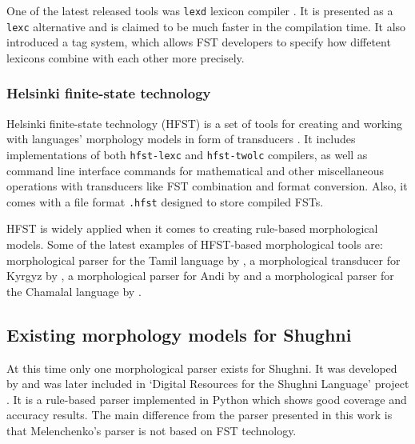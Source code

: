 One of the latest released tools was \texttt{lexd} lexicon compiler \parencite{swanson_lexd_2021}. It is presented as a \texttt{lexc} alternative and is  claimed to be much faster in the compilation time. It also introduced a tag system, which allows FST developers to specify how diffetent lexicons combine with each other more precisely. 

\subsubsection{Helsinki finite-state technology}
Helsinki finite-state technology (HFST) is a set of tools for creating and working with languages' morphology models in form of transducers \parencite{linden_hfst_2009}. It includes implementations of both \texttt{hfst-lexc} and \texttt{hfst-twolc} compilers, as well as command line interface commands for mathematical and other miscellaneous operations with transducers like FST combination and format conversion. Also, it comes with a file format \texttt{.hfst} designed to store compiled FSTs.

HFST is widely applied when it comes to creating rule-based morphological models. Some of the latest examples of HFST-based morphological tools are: morphological parser for the Tamil language by \textcite{sarveswaran_morph_2021}, a morphological transducer for Kyrgyz by \textcite{washington_finite_2012}, a morphological parser for Andi by \textcite{buntyakova_2023_twol} and a morphological parser for the Chamalal language by \textcite{budilova_2023_twol}.

\subsection{Existing morphology models for Shughni}
At this time only one morphological parser exists for Shughni. It was developed by \textcite{melenchenko_2021_parser} and was later included in `Digital Resources for the Shughni Language' project \parencite{makarov_digital_2022}. It is a rule-based parser implemented in Python which shows good coverage and accuracy results. The main difference from the parser presented in this work is that Melenchenko's parser is not based on FST technology.